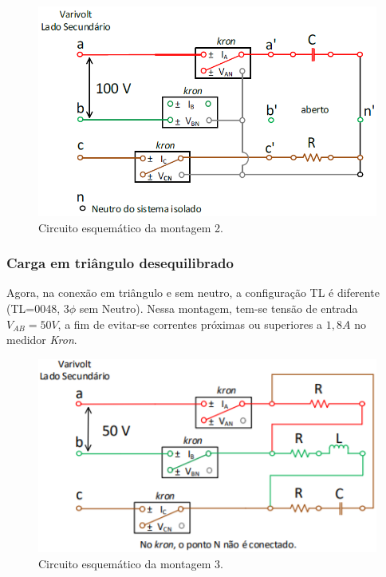 \documentclass[a4paper,12pt,oneside,openany,table,xcdraw]{article}
\begin{document}
\vspace{0.1cm}
\begin{figure}[H]
\centering
\includegraphics[width=13cm]{m2-circuito}
\caption{Circuito esquemático da montagem 2.}
\label{m2:esquema}
\end{figure}
\vspace{0.1cm}

\subsubsection{Carga em triângulo desequilibrado} \label{m3:montagem}
Agora, na conexão em triângulo e sem neutro, a configuração TL é diferente (TL=0048, $3\phi$ sem Neutro). Nessa montagem, tem-se tensão de entrada $V_{AB}=50V$, a fim de evitar-se correntes próximas ou superiores a $1,8A$ no medidor \emph{Kron}. 

\vspace{0.15cm}
\begin{figure}[H]
\centering
\includegraphics[width=13cm]{m3-circuito}
\caption{Circuito esquemático da montagem 3.}
\label{m3:esquema}
\end{figure}
\vspace{0.2cm}
\end{document}
